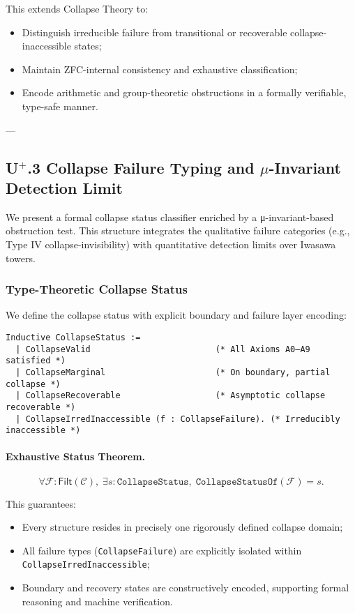 \documentclass[11pt]{article}
\begin{document}
This extends Collapse Theory to:

\begin{itemize}
    \item Distinguish irreducible failure from transitional or recoverable collapse-inaccessible states;
    \item Maintain ZFC-internal consistency and exhaustive classification;
    \item Encode arithmetic and group-theoretic obstructions in a formally verifiable, type-safe manner.
\end{itemize}

---

\subsection*{U$^{+}$.3 Collapse Failure Typing and $\mu$-Invariant Detection Limit}

We present a formal collapse status classifier enriched by a μ-invariant-based obstruction test. This structure integrates the qualitative failure categories (e.g., Type IV collapse-invisibility) with quantitative detection limits over Iwasawa towers.

\subsubsection*{Type-Theoretic Collapse Status}

We define the collapse status with explicit boundary and failure layer encoding:

\begin{lstlisting}[language=Coq, caption=Collapse Status Typing]
Inductive CollapseStatus :=
  | CollapseValid                         (* All Axioms A0–A9 satisfied *)
  | CollapseMarginal                      (* On boundary, partial collapse *)
  | CollapseRecoverable                   (* Asymptotic collapse recoverable *)
  | CollapseIrredInaccessible (f : CollapseFailure). (* Irreducibly inaccessible *)
\end{lstlisting}

\paragraph{Exhaustive Status Theorem.}
\[
\forall \mathcal{F} : \mathsf{Filt}(\mathcal{C}),\;
\exists s : \texttt{CollapseStatus},\; \texttt{CollapseStatusOf}(\mathcal{F}) = s.
\]

This guarantees:
\begin{itemize}
    \item Every structure resides in precisely one rigorously defined collapse domain;
    \item All failure types (\texttt{CollapseFailure}) are explicitly isolated within \texttt{CollapseIrredInaccessible};
    \item Boundary and recovery states are constructively encoded, supporting formal reasoning and machine verification.
\end{itemize}
\end{document}
